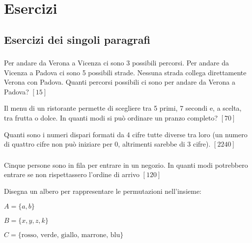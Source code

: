
\section{Esercizi}

\subsection{Esercizi dei singoli paragrafi}

\subsubsection*{}

\begin{esercizio}
\label{ese:I.1}
Per andare da Verona a Vicenza ci sono 3 possibili percorsi. Per andare da Vicenza a Padova ci sono 5 possibili strade. Nessuna strada collega direttamente Verona con Padova. Quanti percorsi possibili ci sono per andare da Verona a Padova?
\hfill \(\left[15\right]\)
\end{esercizio}

\begin{esercizio}
\label{ese:I.2}
Il menu di un ristorante permette di scegliere tra 5 primi, 7 secondi e, a scelta, tra frutta o dolce. In quanti modi si può ordinare un pranzo completo?
\hfill \(\left[70\right]\)
\end{esercizio}

\begin{esercizio}\label{ese:I.3}
Quanti sono i numeri dispari formati da 4 cifre tutte diverse tra loro (un numero di quattro cifre non può iniziare per 0, altrimenti sarebbe di 3 cifre).
\hfill \(\left[2240\right]\)
\end{esercizio}


\subsubsection*{}
\begin{esercizio}
\label{ese:P.1}
Cinque persone sono in fila per entrare in un negozio. In quanti modi potrebbero entrare se non rispettassero l'ordine di arrivo
\hfill \(\left[120\right]\)
\end{esercizio}

\begin{esercizio}\label{ese:P.2}
Disegna un albero per rappresentare le permutazioni nell'insieme:
 \begin{enumeratea}
  \item \(A=\{ a,b\}\)
  \item \(B=\{ x,y,z,k\}\)
  \item \(C=\{\text{rosso, verde, giallo, marrone, blu}\}\)
 \end{enumeratea}
\end{esercizio}

